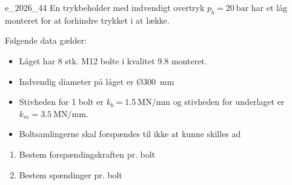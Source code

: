     \begin{problemwithimage}{e_2026_4}{4}
      En trykbeholder med indvendigt overtryk $p_b = \qty{20}{\bar} $ har et låg monteret for at forhindre trykket i at lække.

      Følgende data gælder:
      \begin{itemize}
        \item Låget har 8 stk. M12 bolte i kvalitet \num{9.8} monteret.
        \item Indvendig diameter på låget er Ø\qty{300}{\mm} 
        \item Stivheden for 1 bolt er $k_b = \qty{1.5}{\mega\N\per\mm}$ og stivheden for underlaget er $k_m = \qty{3.5}{\mega\N\per\mm}$.
        \item Boltsamlingerne skal forspændes til ikke at kunne skilles ad
      \end{itemize}

      \begin{enumerate}
        \item Bestem forspændingskraften pr. bolt
        \item Bestem spændinger pr. bolt
      \end{enumerate}
    \end{problemwithimage}

